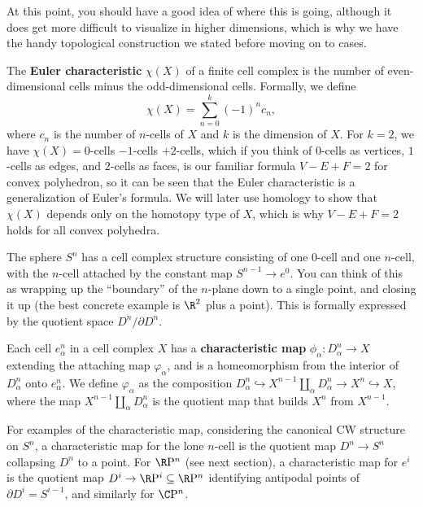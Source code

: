 \begin{example}
\begin{enumerate}[label=(\arabic*)]
    \end{enumerate}
At this point, you should have a good idea of where this is going, although it does get more difficult to visualize in higher dimensions, which is why we have the handy topological construction we stated before moving on to cases. 
\end{example}
\begin{definition}
    The \textbf{Euler characteristic} $\chi (X)$ of a finite cell complex is the number of even-dimensional cells minus the odd-dimensional cells. Formally, we define 
    \[
    \chi(X)=\sum_{n=0}^{k} (-1)^n c_n,
    \] 
    where $c_n $ is the number of $n$-cells of $X$ and $k$ is the dimension of $X$. For $k=2$, we have $\chi (X)=0$-cells $-1$-cells $+2$-cells, which if you think of $ 0$-cells as vertices, $1$-cells as edges, and $2$-cells as faces, is our familiar formula $V-E+F=2$ for convex polyhedron, so it can be seen that the Euler characteristic is a generalization of Euler's formula. We will later use homology to show that $\chi(X)$ depends only on the homotopy type of $X$, which is why $V-E+F=2$ holds for all convex polyhedra.
\end{definition}
\begin{example}
    The sphere $S^n $ has a cell complex structure consisting of one $0$-cell and one $n$-cell, with the $n$-cell attached by the constant map $S^{n-1}\to e^0$. You can think of this as wrapping up the ``boundary'' of the $n$-plane down to a single point, and closing it up (the best concrete example is $\R^2$ plus a point). This is formally expressed by the quotient space $D^n / \partial D^n $.
\end{example}
\begin{definition}[]
    Each cell $e_{\alpha }^n $ in a cell complex $X$ has a \textbf{characteristic map} $\phi_{\alpha }\colon D_{\alpha }^n  \to X$ extending the attaching map $\varphi _{\alpha }$, and is a homeomorphism from the interior of $D_{\alpha }^n $ onto $e_{\alpha}^n  $. We define $\varphi _{\alpha }$ as the composition $D_{\alpha }^n \hookrightarrow X^{n-1}\amalg_{\alpha }D_{\alpha }^n \to X^n \hookrightarrow X$, where the map $X^{n-1}\amalg_{\alpha }D^n _{\alpha }$ is the quotient map that builds $X^n $ from $X^{n-1}$.
\end{definition}
\begin{example}
    For examples of the characteristic map, considering the canonical CW structure on $S^n $, a characteristic map for the lone $n$-cell is the quotient map $D^n \to S^n $ collapsing $D^n $ to a point. For $\R\mathrm P^n $ (see next section), a characteristic map for $e^i $ is the quotient map $D^i \to \R\mathrm P^i \subseteq \R\mathrm P^n $ identifying antipodal points of $\partial D^i =S^{i-1}$, and similarly for $\C\mathrm P^n $.
\end{example}
